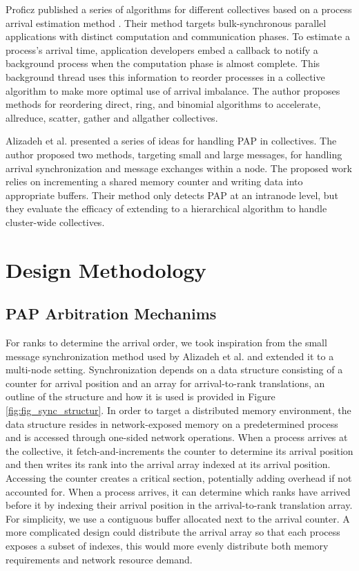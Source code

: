Proficz published a series of algorithms for different collectives based on a process arrival estimation method \cite{Proficz2018ImprvAllReduceForImbPAP, Proficz2020PAPAwareScatterGather, Proficz2021AllGatherResilientToImbPAP}.
Their method targets bulk-synchronous parallel applications with distinct computation and communication phases.
To estimate a process's arrival time, application developers embed a callback to notify a background process when the computation phase is almost complete.
This background thread uses this information to reorder processes in a collective algorithm to make more optimal use of arrival imbalance.
The author proposes methods for reordering direct, ring, and binomial algorithms to accelerate, allreduce, scatter, gather and allgather collectives.

Alizadeh et al. \cite{Alizadeh2022PAPCollDL} presented a series of ideas for handling \gls{PAP} in collectives. 
The author proposed two methods, targeting small and large messages, for handling arrival synchronization and message exchanges within a node.
The proposed work relies on incrementing a shared memory counter and writing data into appropriate buffers.
Their method only detects \gls{PAP} at an intranode level, but they evaluate the efficacy of extending to a hierarchical algorithm to handle cluster-wide collectives.

\section{Design Methodology}
\subsection{PAP Arbitration Mechanims}
For ranks to determine the arrival order, we took inspiration from the small message synchronization method used by Alizadeh et al. \cite{Alizadeh2022PAPCollDL} and extended it to a multi-node setting.
Synchronization depends on a data structure consisting of a counter for arrival position and an array for arrival-to-rank translations, an outline of the structure and how it is used is provided in Figure \ref{fig:fig_sync_structur}.
In order to target a distributed memory environment, the data structure resides in network-exposed memory on a predetermined process and is accessed through one-sided network operations.
When a process arrives at the collective, it fetch-and-increments the counter to determine its arrival position and then writes its rank into the arrival array indexed at its arrival position.
Accessing the counter creates a critical section, potentially adding overhead if not accounted for.
When a process arrives, it can determine which ranks have arrived before it by indexing their arrival position in the arrival-to-rank translation array.
For simplicity, we use a contiguous buffer allocated next to the arrival counter.
A more complicated design could distribute the arrival array so that each process exposes a subset of indexes, this would more evenly distribute both memory requirements and network resource demand.

